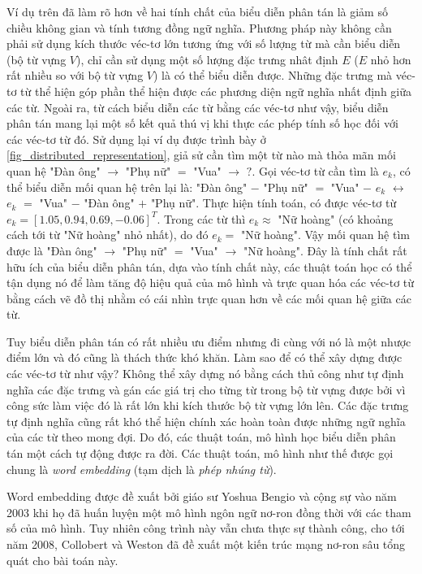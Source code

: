 Ví dụ trên đã làm rõ hơn về hai tính chất của biểu diễn phân tán là giảm số chiều không gian và tính tương đồng ngữ nghĩa. Phương pháp này không cần phải sử dụng kích thước véc-tơ lớn tương ứng với số lượng từ mà cần biểu diễn (bộ từ vựng $V$), chỉ cần sử dụng một số lượng đặc trưng nhât định $E$ ($E$ nhỏ hơn rất nhiều so với bộ từ vựng $V$) là có thể biểu diễn được. Những đặc trưng mà véc-tơ từ thể hiện góp phần thể hiện được các phương diện ngữ nghĩa nhất định giữa các từ. Ngoài ra, từ cách biểu diễn các từ bằng các véc-tơ như vậy, biểu diễn phân tán mang lại một số kết quả thú vị khi thực các phép tính số học đối với các véc-tơ từ đó. Sử dụng lại ví dụ được trình bày ở \ref{fig_distributed_representation}, giả sử cần tìm một từ nào mà thỏa mãn mối quan hệ "Đàn ông" $\rightarrow$ "Phụ nữ" $=$ "Vua" $\rightarrow$ $?$. 	Gọi véc-tơ từ cần tìm là $e_k$, có thể biểu diễn mối quan hệ trên lại là: "Đàn ông" $-$ "Phụ nữ" $=$ "Vua" $-$ $e_k$ $\leftrightarrow$ $e_k$ $=$ "Vua" $-$ "Đàn ông" $+$ "Phụ nữ". Thực hiện tính toán, có được véc-tơ từ $e_k = \left[ 1.05, 0.94, 0.69, -0.06\right]^T$. Trong các từ thì $e_k \approx$ "Nữ hoàng" (có khoảng cách tới từ "Nữ hoàng" nhỏ nhất), do đó $e_k =$ "Nữ hoàng". Vậy mối quan hệ tìm được là "Đàn ông" $\rightarrow$ "Phụ nữ" $=$ "Vua" $\rightarrow$ "Nữ hoàng". Đây là tính chất rất hữu ích của biểu diễn phân tán, dựa vào tính chất này, các thuật toán học có thể tận dụng nó để làm tăng độ hiệu quả của mô hình và trực quan hóa các véc-tơ từ bằng cách vẽ đồ thị nhằm có cái nhìn trực quan hơn về các mối quan hệ giữa các từ.

Tuy biểu diễn phân tán có rất nhiều ưu điểm nhưng đi cùng với nó là một nhược điểm lớn và đó cũng là thách thức khó khăn. Làm sao để có thể xây dựng được các véc-tơ từ như vậy? Không thể xây dựng nó bằng cách thủ công như tự định nghĩa các đặc trưng và gán các giá trị cho từng từ trong bộ từ vựng được bởi vì công sức làm việc đó là rất lớn khi kích thước bộ từ vựng lớn lên. Các đặc trưng tự định nghĩa cũng rất khó thể hiện chính xác hoàn toàn được những ngữ nghĩa của các từ theo mong đợi. Do đó, các thuật toán, mô hình học biểu diễn phân tán một cách tự động được ra đời. Các thuật toán, mô hình như thế được gọi chung là \textit{word embedding} (tạm dịch là \textit{phép nhúng từ}).

Word embedding được đề xuất bởi giáo sư Yoshua Bengio và cộng sự vào năm 2003 \cite{bengioLM2003} khi họ đã huấn luyện một mô hình ngôn ngữ nơ-ron đồng thời với các tham số của mô hình. Tuy nhiên công trình này vẫn chưa thực sự thành công, cho tới năm 2008, Collobert và Weston \cite{wordembeddingCollobert2008} đã đề xuất một kiến trúc mạng nơ-ron sâu tổng quát cho bài toán này.


